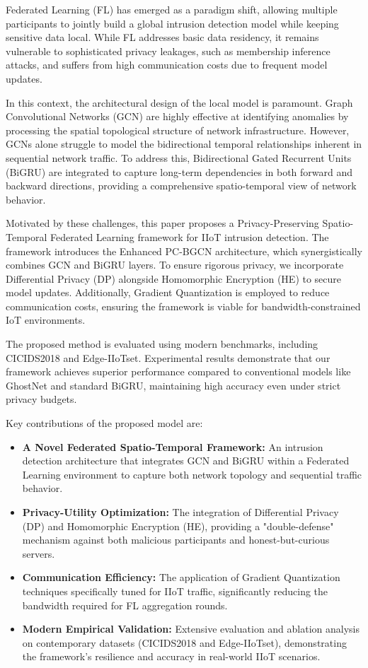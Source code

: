 \documentclass[a4paper,fleqn]{cas-sc}
\begin{document}
Federated Learning (FL) has emerged as a paradigm shift, allowing multiple participants to jointly build a global intrusion detection model while keeping sensitive data local. While FL addresses basic data residency, it remains vulnerable to sophisticated privacy leakages, such as membership inference attacks, and suffers from high communication costs due to frequent model updates.

In this context, the architectural design of the local model is paramount. Graph Convolutional Networks (GCN) are highly effective at identifying anomalies by processing the spatial topological structure of network infrastructure. However, GCNs alone struggle to model the bidirectional temporal relationships inherent in sequential network traffic. To address this, Bidirectional Gated Recurrent Units (BiGRU) are integrated to capture long-term dependencies in both forward and backward directions, providing a comprehensive spatio-temporal view of network behavior.

Motivated by these challenges, this paper proposes a Privacy-Preserving Spatio-Temporal Federated Learning framework for IIoT intrusion detection. The framework introduces the Enhanced PC-BGCN architecture, which synergistically combines GCN and BiGRU layers. To ensure rigorous privacy, we incorporate Differential Privacy (DP) alongside Homomorphic Encryption (HE) to secure model updates. Additionally, Gradient Quantization is employed to reduce communication costs, ensuring the framework is viable for bandwidth-constrained IoT environments.

The proposed method is evaluated using modern benchmarks, including CICIDS2018 and Edge-IIoTset. Experimental results demonstrate that our framework achieves superior performance compared to conventional models like GhostNet and standard BiGRU, maintaining high accuracy even under strict privacy budgets.

Key contributions of the proposed model are:

\begin{itemize}
\item \textbf{A Novel Federated Spatio-Temporal Framework:} An intrusion detection architecture that integrates GCN and BiGRU within a Federated Learning environment to capture both network topology and sequential traffic behavior.
\item \textbf{Privacy-Utility Optimization:} The integration of Differential Privacy (DP) and Homomorphic Encryption (HE), providing a "double-defense" mechanism against both malicious participants and honest-but-curious servers.
\item \textbf{Communication Efficiency:} The application of Gradient Quantization techniques specifically tuned for IIoT traffic, significantly reducing the bandwidth required for FL aggregation rounds.
\item \textbf{Modern Empirical Validation:} Extensive evaluation and ablation analysis on contemporary datasets (CICIDS2018 and Edge-IIoTset), demonstrating the framework's resilience and accuracy in real-world IIoT scenarios.
\end{itemize}
\end{document}
